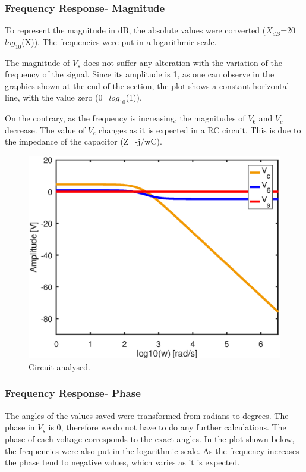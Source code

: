 \subsubsection{Frequency Response- Magnitude}

To represent the magnitude in dB, the absolute values were converted ($X_{dB}$=20$log_{10}$(X)). The frequencies were put in a logarithmic scale.

The magnitude of $V_s$ does not suffer any alteration with the variation of the frequency of the signal. Since its amplitude is 1, as one can observe in the graphics shown at the end of the section, the plot shows a constant horizontal line, with the value zero (0=$log_{10}$(1)).

On the contrary, as the frequency is increasing, the magnitudes of $V_6$ and $V_c$ decrease. The value of $V_c$ changes as it is expected in a RC circuit. This is due to the impedance of the capacitor (Z=-j/wC).

\begin{figure}[h] \centering
\includegraphics[width=0.6\linewidth]{part6_amp.eps}
\caption{Circuit analysed.}
\label{Magnitude response.}
\end{figure}

\subsubsection{Frequency Response- Phase}


The angles of the values saved were transformed from radians to degrees. The phase in $V_s$ is 0, therefore we do not have to do any further calculations. The phase of each voltage corresponds to the exact angles. In the plot shown below, the frequencies were also  put in the logarithmic scale. As the frequency increases the phase tend to negative values, which varies as it is expected.

